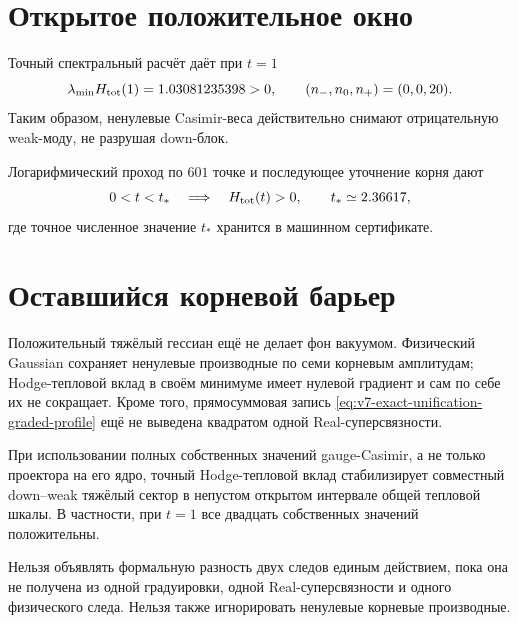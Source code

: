 \section{Открытое положительное окно}

Точный спектральный расчёт даёт при $t=1$
\begin{equation}
 \lambda_{\min}H_{\rm tot}(1)=1.03081235398>0,
 \qquad (n_-,n_0,n_+)=(0,0,20).
 \label{eq:v7-exact-unification-benchmark}
\end{equation}
Таким образом, ненулевые Casimir-веса действительно снимают отрицательную
weak-моду, не разрушая down-блок.

Логарифмический проход по $601$ точке и последующее уточнение корня дают
\begin{equation}
 0<t<t_*\quad\Longrightarrow\quad H_{\rm tot}(t)>0,
 \qquad t_*\simeq2.36617,
 \label{eq:v7-exact-unification-positive-window}
\end{equation}
где точное численное значение $t_*$ хранится в машинном сертификате.

\section{Оставшийся корневой барьер}

Положительный тяжёлый гессиан ещё не делает фон вакуумом. Физический
Gaussian сохраняет ненулевые производные по семи корневым амплитудам;
Hodge-тепловой вклад в своём минимуме имеет нулевой градиент и сам по себе
их не сокращает. Кроме того, прямосуммовая запись
\eqref{eq:v7-exact-unification-graded-profile} ещё не выведена квадратом
одной Real-суперсвязности.

\begin{theorem}
При использовании полных собственных значений gauge-Casimir, а не только
проектора на его ядро, точный Hodge-тепловой вклад стабилизирует совместный
down--weak тяжёлый сектор в непустом открытом интервале общей тепловой
шкалы. В частности, при $t=1$ все двадцать собственных значений положительны.
\end{theorem}

\begin{nogocriterion}
Нельзя объявлять формальную разность двух следов единым действием, пока она
не получена из одной градуировки, одной Real-суперсвязности и одного
физического следа. Нельзя также игнорировать ненулевые корневые производные.
\end{nogocriterion}

